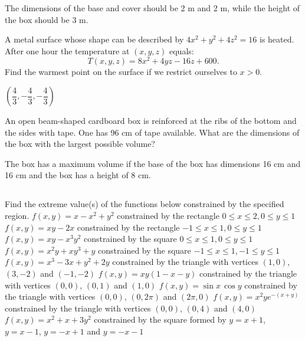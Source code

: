 \begin{Answer}
    The dimensions of the base and cover should be 2 m and 2 m, while the height of the box should be 3 m.
\end{Answer}

\ifcalculus\begin{Exercise}[difficulty = 2]\fi\ifanalysis\begin{Exercise}[difficulty = 1]\fi A metal surface whose shape can be described by $4x^2+y^2+4z^2 = 16$ is heated. After one hour the temperature at $(x,y,z)$ equals: 
\[ T(x,y,z) = 8x^2 + 4yz - 16z + 600.\] 
Find the warmest point on the surface if we restrict ourselves to $x>0$.
\ifanalysis\end{Exercise}\fi\ifcalculus\end{Exercise}\fi

\begin{Answer}

    $\left(\dfrac{4}{3},-\dfrac{4}{3},-\dfrac{4}{3}\right)$
\end{Answer}

\begin{Exercise}[difficulty = 2] An open beam-shaped cardboard box is reinforced at the ribs of the bottom and the sides with  tape. One has 96 cm of  tape available. What are the dimensions of the box with the largest possible volume?
\end{Exercise}

\begin{Answer}
    The box has a maximum volume if the base of the box has dimensions 16 cm and 16 cm and the box has a height of 8 cm.
\end{Answer}


\subsection*{}

\begin{Exercise} Find the extreme value(s) of the functions below constrained by the specified region. 
    \Question[difficulty=1] $f(x,y)=x-x^2+y^2$ constrained by the rectangle $0 \leq x \leq 2, 0 \leq y \leq 1$
    \Question[difficulty=1] $f(x,y)=xy-2x$ constrained by  the rectangle $-1 \leq x \leq 1, 0 \leq y \leq 1$
    \ifcalculus\Question[difficulty=2]\fi\ifanalysis\Question[difficulty=1]\fi $f(x,y)=xy-x^3y^2$ constrained by  the square $0 \leq x \leq 1, 0 \leq y \leq 1$
    \ifcalculus\Question[difficulty=1] $f(x,y)=x^2y+xy^3+y$ constrained by  the square $-1 \leq x \leq 1, -1 \leq y \leq 1$
    \Question[difficulty=1] $f(x,y)=x^3-3x+y^2+2y$ constrained by  the triangle with vertices $(1,0)$, $(3,-2)$ and $(-1,-2)$
    \fi
    \Question[difficulty=1] $f(x,y)=xy(1-x-y)$ constrained by  the triangle with vertices $(0,0)$, $(0,1)$ and $(1,0)$
    \Question[difficulty=2] $f(x,y)=\sin x \, \cos y$ constrained by  the triangle with vertices $(0,0)$, $(0,2\pi)$ and $(2\pi,0)$
    \Question [difficulty=3] $f(x,y)=x^2ye^{-(x+y)}$ constrained by  the triangle with vertices $(0,0)$, $(0,4)$ and $(4,0)$
    \ifcalculus \Question[difficulty=2] $f(x,y) = x^2+x+3y^2$ constrained by  the square formed by $y=x+1$, $y=x-1$, $y=-x+1$ and $y=-x-1$\fi
\end{Exercise}

